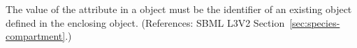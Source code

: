 The value of the attribute  in a \Species object must be
the identifier of an existing \Compartment object defined in the enclosing
\Model object.  (References: SBML L3V2
Section~\ref{sec:species-compartment}.)
